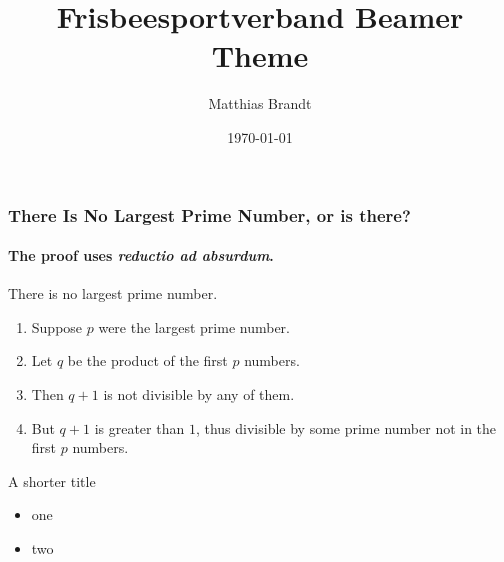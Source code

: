 \documentclass[british, aspectratio=169]{beamer}
\title{Frisbeesportverband Beamer Theme}
\date{\today}
\author[M. Brandt]{Matthias Brandt}
\institute{Deutscher\par Frisbeesport-Verband e.V.}
\begin{document}
\begin{frame}
  \titlepage
\end{frame}

\begin{frame} 
  \frametitle{There Is No Largest Prime Number, or is there?} 
  \framesubtitle{The proof uses \textit{reductio ad absurdum}.} 
  \begin{theorem}
    There is no largest prime number. \end{theorem} 
  \begin{enumerate} 
  \item<1-| alert@1> Suppose $p$ were the largest prime number. 
  \item<2-> Let $q$ be the product of the first $p$ numbers. 
  \item<3-> Then $q+1$ is not divisible by any of them. 
  \item<1-> But $q + 1$ is greater than $1$, thus divisible by some prime
    number not in the first $p$ numbers.
  \end{enumerate}
\end{frame}

\begin{frame}{A shorter title}
  \begin{itemize}
  \item one
  \item two
  \end{itemize}
\end{frame}
\end{document}
